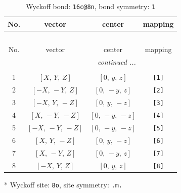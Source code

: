 \documentclass[fleqn,8pt]{jsarticle}
\begin{document}
\renewcommand{\arraystretch}{1.2}
\begin{longtable}{cccc}
\caption{Wyckoff bond: {\tt 16c@8n}, bond symmetry: {\tt 1}}
 \\
 \hline \hline
No. & vector & center & mapping \\ \hline \endfirsthead

\multicolumn{3}{l}{\tablename\ \thetable{}} \\
 \hline \hline
No. & vector & center & mapping \\ \hline \endhead

 \hline \hline
\multicolumn{3}{r}{\footnotesize\it continued ...} \\ \endfoot

 \hline \hline
\multicolumn{3}{r}{} \\ \endlastfoot

1 & $\left[ X,\, Y,\, Z \right]$ & $\left[ 0,\, y,\, z \right]$ & {\tt [1]} \\ \hline
2 & $\left[ - X,\, - Y,\, Z \right]$ & $\left[ 0,\, - y,\, z \right]$ & {\tt [2]} \\ \hline
3 & $\left[ - X,\, Y,\, - Z \right]$ & $\left[ 0,\, y,\, - z \right]$ & {\tt [3]} \\ \hline
4 & $\left[ X,\, - Y,\, - Z \right]$ & $\left[ 0,\, - y,\, - z \right]$ & {\tt [4]} \\ \hline
5 & $\left[ - X,\, - Y,\, - Z \right]$ & $\left[ 0,\, - y,\, - z \right]$ & {\tt [5]} \\ \hline
6 & $\left[ X,\, Y,\, - Z \right]$ & $\left[ 0,\, y,\, - z \right]$ & {\tt [6]} \\ \hline
7 & $\left[ X,\, - Y,\, Z \right]$ & $\left[ 0,\, - y,\, z \right]$ & {\tt [7]} \\ \hline
8 & $\left[ - X,\, Y,\, Z \right]$ & $\left[ 0,\, y,\, z \right]$ & {\tt [8]} \\
\end{longtable}
* Wyckoff site: {\tt 8o}, site symmetry: {\tt .m.}
\renewcommand{\arraystretch}{1.2}
\end{document}
